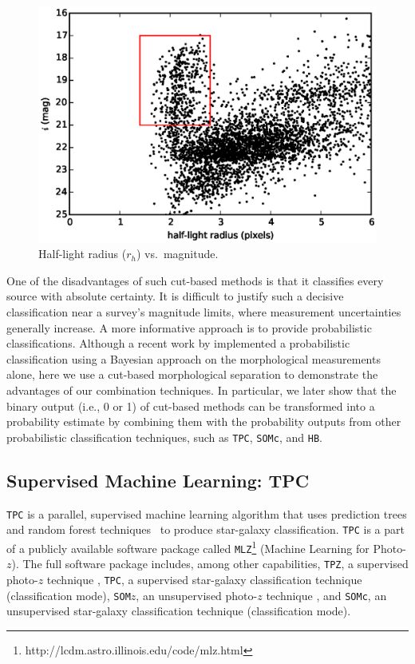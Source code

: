 \documentclass[useAMS,usenatbib]{mn2e}
\newcommand{\ie}{{i.e., }}
\begin{document}
\begin{figure}
  \centering
  \includegraphics[width=0.95\linewidth]{figures/morph.eps}
  \caption{Half-light radius ($r_h$) vs.\ magnitude.}
  \label{fig:morph}
\end{figure}


One of the disadvantages of such cut-based methods is
that it classifies every source with absolute certainty.
It is difficult to justify such a decisive classification
near a survey's magnitude limits,
where measurement uncertainties generally increase.
A more informative approach is to provide probabilistic classifications.
Although a recent work by \cite{henrion2011bayesian}
implemented a probabilistic classification using a Bayesian approach
on the morphological measurements alone,
here we use a cut-based morphological separation
to demonstrate the advantages of our combination techniques.
In particular, we later show that
the binary output (\ie 0 or 1) of cut-based methods
can be transformed into a
probability estimate by combining them
with the probability outputs from other
probabilistic classification techniques,
such as \texttt{TPC}, \texttt{SOMc}, and \texttt{HB}.


\subsection{Supervised Machine Learning: TPC}

\texttt{TPC} is a parallel, supervised machine learning algorithm
that uses prediction trees and random forest 
techniques~\citep{breiman1984classification, breiman2001random}
to produce star-galaxy classification.
\texttt{TPC} is a part of a publicly available software package called
\texttt{MLZ}\footnote{http://lcdm.astro.illinois.edu/code/mlz.html}
(Machine Learning for Photo-$z$).
The full software package includes, among other capabilities,
\texttt{TPZ}, a supervised photo-$z$ technique
\citep[regression mode;][]{carrascokind2013tpz},
\texttt{TPC}, a supervised star-galaxy classification technique
(classification mode),
\texttt{SOM}$z$, an unsupervised photo-$z$ technique
\citep[regression mode;][]{carrascokind2014somz},
and
\texttt{SOMc}, an unsupervised star-galaxy classification technique
(classification mode).
\end{document}
